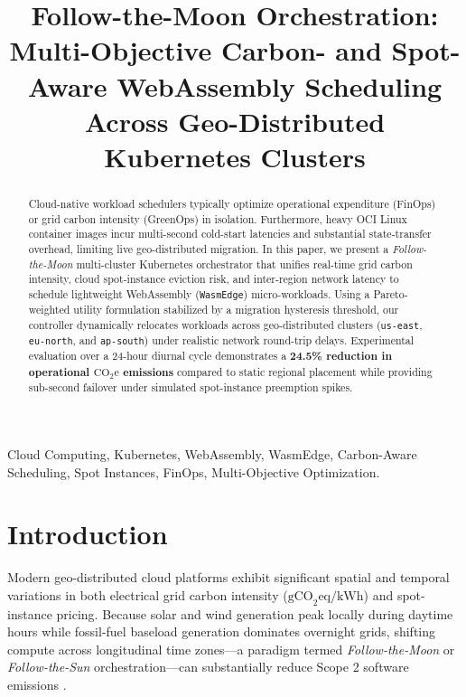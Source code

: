 \documentclass[conference]{IEEEtran}
\begin{document}
\title{Follow-the-Moon Orchestration: Multi-Objective Carbon- and Spot-Aware WebAssembly Scheduling Across Geo-Distributed Kubernetes Clusters}

\author{
}

\maketitle

\begin{abstract}
Cloud-native workload schedulers typically optimize operational expenditure (FinOps) or grid carbon intensity (GreenOps) in isolation. Furthermore, heavy OCI Linux container images incur multi-second cold-start latencies and substantial state-transfer overhead, limiting live geo-distributed migration. In this paper, we present a \textit{Follow-the-Moon} multi-cluster Kubernetes orchestrator that unifies real-time grid carbon intensity, cloud spot-instance eviction risk, and inter-region network latency to schedule lightweight WebAssembly (\texttt{WasmEdge}) micro-workloads. Using a Pareto-weighted utility formulation stabilized by a migration hysteresis threshold, our controller dynamically relocates workloads across geo-distributed clusters (\texttt{us-east}, \texttt{eu-north}, and \texttt{ap-south}) under realistic network round-trip delays. Experimental evaluation over a 24-hour diurnal cycle demonstrates a \textbf{24.5\% reduction in operational $\text{CO}_2\text{e}$ emissions} compared to static regional placement while providing sub-second failover under simulated spot-instance preemption spikes.
\end{abstract}

\begin{IEEEkeywords}
Cloud Computing, Kubernetes, WebAssembly, WasmEdge, Carbon-Aware Scheduling, Spot Instances, FinOps, Multi-Objective Optimization.
\end{IEEEkeywords}

\section{Introduction}
Modern geo-distributed cloud platforms exhibit significant spatial and temporal variations in both electrical grid carbon intensity ($\text{gCO}_2\text{eq/kWh}$) and spot-instance pricing. Because solar and wind generation peak locally during daytime hours while fossil-fuel baseload generation dominates overnight grids, shifting compute across longitudinal time zones---a paradigm termed \textit{Follow-the-Moon} or \textit{Follow-the-Sun} orchestration---can substantially reduce Scope 2 software emissions \cite{b1}.
\end{document}
